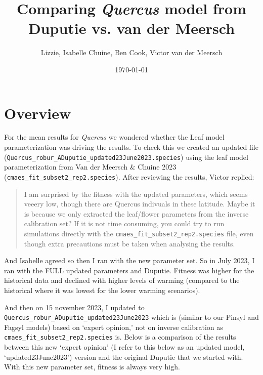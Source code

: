 \documentclass[11pt,letter]{article}
\begin{document}

\renewcommand{\refname}{\CHead{}}

\title{Comparing \emph{Quercus} model from \\ Duputie vs. van der Meersch}
\author{Lizzie, Isabelle Chuine, Ben Cook, Victor van der Meersch}
\date{\today}
\maketitle


\section*{Overview}
For the mean results for \emph{Quercus} we wondered whether the Leaf model parameterization was driving the results. To check this we created an updated file\\
 (\verb|Quercus_robur_ADuputie_updated23June2023.species|) using the leaf model parameterization from Van der Meersch \& Chuine 2023 \\(\verb|cmaes_fit_subset2_rep2.species|). After reviewing the results, Victor replied:

\begin{quote}
I am surprised by the fitness with the updated parameters, which seems veeery low, though there are Quercus indivuals in these latitude.
Maybe it is because we only extracted the leaf/flower parameters from the inverse calibration set?
If it is not time consuming, you could try to run simulations directly with the \verb|cmaes_fit_subset2_rep2.species| file, even though extra precautions must be taken when analysing the results.
\end{quote}

And Isabelle agreed so then I ran with the new parameter set. So in July 2023, I ran with the FULL updated parameters and Duputie. Fitness was higher for the historical data and declined with higher levels of warming (compared to the historical where it was lowest for the lower warming scenarios). 

And then on 15 november 2023, I updated to \verb|Quercus_robur_ADuputie_updated23June2023| which is (similar to our Pinsyl and Fagsyl models) based on `expert opinion,' not on inverse calibration as \verb|cmaes_fit_subset2_rep2.species| is. Below is a comparison of the results between this new `expert opinion' (I refer to this below as an updated model, `updated23June2023') version and the original Duputie that we started with. With this new parameter set, fitness is always very high. 
\end{document}
